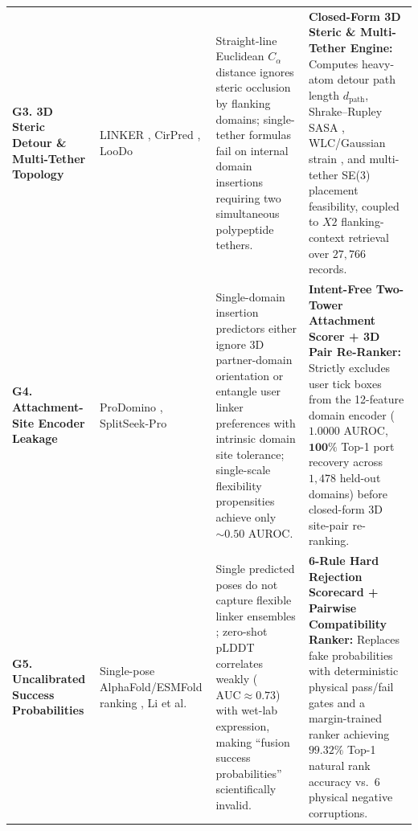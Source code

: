 \documentclass[11pt]{article}
\begin{document}
\begin{table}[t]
\begin{tabular}{p{2.3cm} p{3.4cm} p{4.6cm} p{5.1cm}}
\addlinespace[4pt]
\textbf{G3. 3D Steric Detour \& Multi-Tether Topology} &
LINKER \cite{crasto2000linker}, CirPred \cite{chen2021cirpred}, LooDo \cite{berrondo2018loodo} &
Straight-line Euclidean $C_\alpha$ distance ignores steric occlusion by flanking domains; single-tether formulas fail on internal domain insertions requiring two simultaneous polypeptide tethers. &
\textbf{Closed-Form 3D Steric \& Multi-Tether Engine:} Computes heavy-atom detour path length $d_{\text{path}}$, Shrake--Rupley SASA \cite{shrake1973sasa,tien2013maxasa}, WLC/Gaussian strain \cite{kratky1949wlc,vanrosmalen2017gs}, and multi-tether SE(3) placement feasibility, coupled to $X2$ flanking-context retrieval over $27{,}766$ records. \\
\addlinespace[4pt]
\textbf{G4. Attachment-Site Encoder Leakage} &
ProDomino \cite{wolf2025prodomino}, SplitSeek-Pro \cite{wang2026splitseek} &
Single-domain insertion predictors either ignore 3D partner-domain orientation or entangle user linker preferences with intrinsic domain site tolerance; single-scale flexibility propensities achieve only $\sim 0.50$ AUROC. &
\textbf{Intent-Free Two-Tower Attachment Scorer + 3D Pair Re-Ranker:} Strictly excludes user tick boxes from the 12-feature domain encoder ($\mathbf{1.0000}$ AUROC, $\mathbf{100\%}$ Top-1 port recovery across $1{,}478$ held-out domains) before closed-form 3D site-pair re-ranking. \\
\addlinespace[4pt]
\textbf{G5. Uncalibrated Success Probabilities} &
Single-pose AlphaFold/ESMFold ranking \cite{mcbride2026pose}, Li et al.\ \cite{li2026multimodal} &
Single predicted poses do not capture flexible linker ensembles \cite{mcbride2026pose}; zero-shot pLDDT correlates weakly ($\text{AUC} \approx 0.73$) with wet-lab expression, making ``fusion success probabilities'' scientifically invalid. &
\textbf{6-Rule Hard Rejection Scorecard + Pairwise Compatibility Ranker:} Replaces fake probabilities with deterministic physical pass/fail gates and a margin-trained ranker achieving $\mathbf{99.32\%}$ Top-1 natural rank accuracy vs.\ 6 physical negative corruptions. \\
\bottomrule
\end{tabular}
\end{table}
\end{document}
